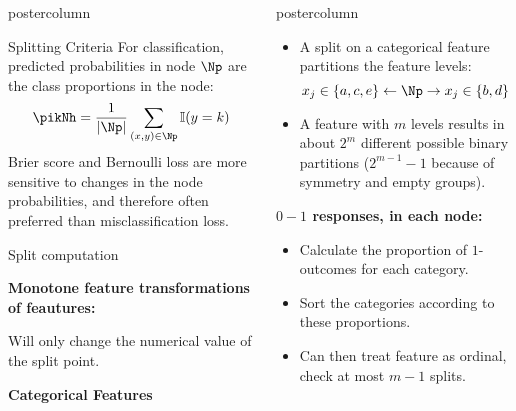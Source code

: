 \documentclass{beamer}
\newlength{\columnheight} %
\begin{document}
\begin{frame}[fragile]{}
\begin{columns}
\begin{column}{.31\textwidth}
\begin{beamercolorbox}[center]{postercolumn}
\begin{minipage}{.98\textwidth}
{\begin{myblock}{Splitting Criteria}
    For classification, predicted probabilities in node $\Np$ are the class proportions in the node:
    $$ \pikNh = \frac{1}{|\Np|} \sum\limits_{(x,y) \in \Np} \I(y = k) $$
    Brier score and Bernoulli loss are more sensitive to changes in the node probabilities, and therefore often preferred than misclassification loss.
  \end{myblock}

  \begin{myblock}{Split computation}
  
    \begin{codebox}
    \textbf{Monotone feature transformations of feautures: }
    \end{codebox}
    Will only change the numerical value of the split point.

    \begin{codebox}
      \textbf{Categorical Features}	
      \end{codebox}
      
  \end{myblock}  
}
\end{minipage}
\end{beamercolorbox}
\end{column}


\begin{column}{.31\textwidth}
\begin{beamercolorbox}[center]{postercolumn}
\begin{minipage}{.98\textwidth}
\parbox[t][\columnheight]{\textwidth}{
  \begin{myblock}{ }
  
  \begin{itemize}[$\bullet$]     
  \setlength{\itemindent}{+.3in}
  \item A split on a categorical feature partitions the feature levels:
    $$x_j \in \{a,c,e\} \leftarrow \Np \rightarrow x_j \in \{b,d\} $$
    \item A feature with $m$ levels results in about $2^m$ different possible binary partitions ($2^{m-1} - 1$ because of symmetry and empty groups).
  \end{itemize}

  \begin{codebox}
  \textbf{$0-1$ responses, in each node: }
  \end{codebox}
  
  \begin{itemize}[$\bullet$]     
  \setlength{\itemindent}{+.3in}
  \item Calculate the proportion of $1$-outcomes for each category.
  \item Sort the categories according to these proportions.
  \item Can then treat feature as ordinal, check at most $m-1$ splits.
  \end{itemize}


\end{myblock}}
\end{minipage}
\end{beamercolorbox}
\end{column}
\end{columns}
\end{frame}
\end{document}
